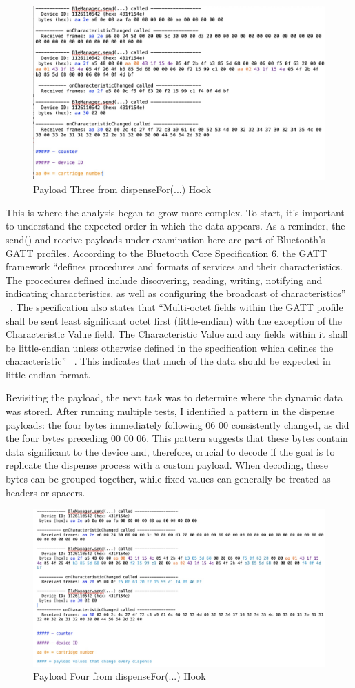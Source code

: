 \begin{figure}[H]
	\centering
	\includegraphics[width=0.7\linewidth]{payload3}
	\caption{Payload Three from dispenseFor(...) Hook}
	\label{fig:payload3}
\end{figure}

This is where the analysis began to grow more complex. To start, it’s important to understand the expected order in which the data appears. As a reminder, the send() and receive payloads under examination here are part of Bluetooth’s GATT profiles. According to the Bluetooth Core Specification 6, the GATT framework “defines procedures and formats of services and their characteristics. The procedures defined include discovering, reading, writing, notifying and indicating characteristics, as well as configuring the broadcast of characteristics” ~\cite{bluetooth2023}. The specification also states that “Multi-octet fields within the GATT profile shall be sent least significant octet first (little-endian) with the exception of the Characteristic Value field. The Characteristic Value and any fields within it shall be little-endian unless otherwise defined in the specification which defines the characteristic” ~\cite{bluetooth2023}. This indicates that much of the data should be expected in little-endian format.

Revisiting the payload, the next task was to determine where the dynamic data was stored. After running multiple tests, I identified a pattern in the dispense payloads: the four bytes immediately following 06 00 consistently changed, as did the four bytes preceding 00 00 06. This pattern suggests that these bytes contain data significant to the device and, therefore, crucial to decode if the goal is to replicate the dispense process with a custom payload. When decoding, these bytes can be grouped together, while fixed values can generally be treated as headers or spacers.

\begin{figure}[H]
	\centering
	\includegraphics[width=0.7\linewidth]{payload4}
	\caption{Payload Four from dispenseFor(...) Hook}
	\label{fig:payload4}
\end{figure}

